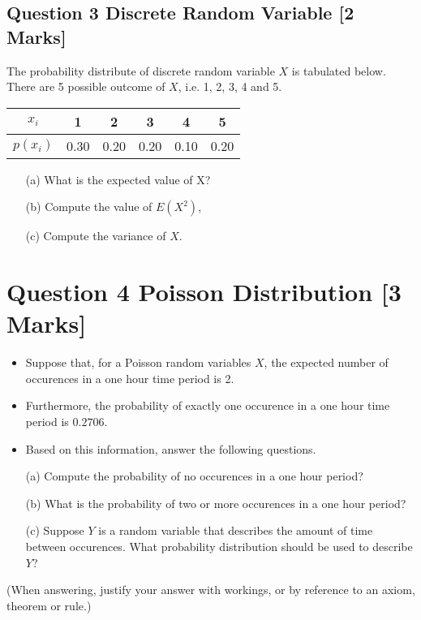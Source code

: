 \subsection*{Question 3 Discrete Random Variable [2 Marks]}
The probability distribute of discrete random variable $X$ is tabulated below. There are 5 possible outcome of $X$, i.e. 1, 2, 3, 4 and 5.
{
\large
\begin{center}
\begin{tabular}{|c||c|c|c|c|c|}
\hline
$x_i$  & 1 & 2 & 3 & 4 & 5  \\\hline
$p(x_i)$ & 0.30 & 0.20 & 0.20 & 0.10 & 0.20 \\
\hline
\end{tabular}
\end{center}
}
\begin{itemize}
\item[(a)]  What is the expected value of X?
\item[(b)]  Compute the value of $E(X^2)$,
\item[(c)]  Compute the variance of $X$.
\end{itemize}
\bigskip
\section*{Question 4 Poisson Distribution [3 Marks]}

\begin{itemize}
\item Suppose that, for a Poisson random variables $X$, the expected number of occurences in a one hour time period is 2. 


\item Furthermore, the probability of exactly one occurence in a one
 hour time period is $0.2706$.

\item Based on this information, answer the following questions.
\end{itemize}
\begin{itemize}
\item[(a)]  Compute the probability of no occurences in a one hour period?
\item[(b)]  What is the probability of two or more occurences in a one hour period?
\item[(c)]  Suppose $Y$ is a random variable that describes the amount of time between occurences. What probability distribution should be used to describe $Y$?
\end{itemize}


\noindent (When answering, justify your answer with workings, or by reference to an
axiom, theorem or rule.)
